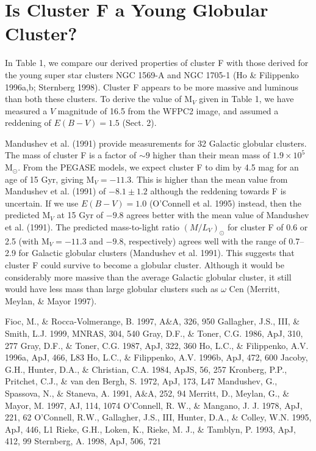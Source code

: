 \section{Is Cluster F a Young Globular Cluster?}
In Table 1, we compare our derived properties of cluster F with those
derived for the young super star clusters NGC 1569-A and NGC 1705-1
(Ho \& Filippenko 1996a,b; Sternberg 1998).  
Cluster F appears to be more massive and
luminous than both these clusters. To derive the value of M$_V$ given
in Table 1, we have measured a $V$ magnitude of 16.5 from the WFPC2
image, and assumed a reddening of $E(B-V)=1.5$ (Sect. 2).

Mandushev et al. (1991) provide measurements for 32 Galactic globular
clusters. The mass of cluster F is a factor of $\sim 9$ higher than
their mean mass of $1.9 \times 10^5$ M$_\odot$. From the PEGASE
models, we expect cluster F to dim by 4.5 mag for an age of 15 Gyr,
giving M$_V=-11.3$. This is higher than the mean value from Mandushev
et al. (1991) of $-8.1\pm1.2$ although the reddening towards F is
uncertain.  If we use $E(B-V)=1.0$ (O'Connell et al. 1995) instead,
then the predicted M$_V$ at 15 Gyr of $-9.8$ agrees better with the
mean value of Mandushev et al. (1991). The predicted mass-to-light
ratio $(M/L_V)_\odot$ for cluster F of 0.6 or 2.5 (with M$_V=-11.3$
and $-9.8$, respectively) agrees well with the range of 0.7--2.9 for
Galactic globular clusters (Mandushev et al. 1991).
This suggests that cluster F could survive to become a globular
cluster. Although it would be considerably more massive than the average 
Galactic globular cluster, it still would have less mass than large globular
clusters such as $\omega$ Cen (Merritt, Meylan, \& Mayor 1997).
%
\begin{references}
 Fioc, M., \& Rocca-Volmerange, B. 1997, A\&A, 326, 950
 Gallagher, J.S., III, \& Smith, L.J. 1999, MNRAS, 304, 540
 Gray, D.F., \& Toner, C.G. 1986, ApJ, 310, 277
 Gray, D.F., \& Toner, C.G. 1987, ApJ, 322, 360
 Ho, L.C., \& Filippenko, A.V. 1996a, ApJ, 466, L83
 Ho, L.C., \& Filippenko, A.V. 1996b, ApJ, 472, 600
 Jacoby, G.H., Hunter, D.A., \& Christian, C.A. 1984, ApJS, 56, 257
 Kronberg, P.P., Pritchet, C.J., \& van den Bergh, S. 
1972, ApJ, 173, L47
 Mandushev, G., Spassova, N., \& Staneva, A. 1991, A\&A, 252, 94
 Merritt, D., Meylan, G., \& Mayor, M. 1997, AJ, 114, 1074
 O'Connell, R. W., \& Mangano, J. J. 1978, ApJ, 221, 62
 O'Connell, R.W., Gallagher, J.S., III, Hunter, D.A., \& Colley, 
W.N. 1995, ApJ, 446, L1
 Rieke, G.H., Loken, K., Rieke, M. J., \& Tamblyn, P. 
1993, ApJ, 412, 99
 Sternberg, A. 1998, ApJ, 506, 721
\end{references}

